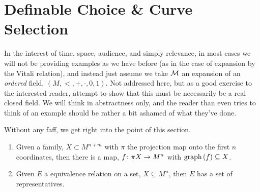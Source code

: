 \section{Definable Choice \& Curve Selection}
\noindent In the interest of time, space, audience, and simply relevance, in most cases we will not be providing examples as we have before (as in the case of expansion by the Vitali relation), and instead just assume we take $\mathcal{M}$ an \om expansion of an \emph{ordered} field, $(M, <, +, \cdot, 0, 1)$. Not addressed here, but as a good exercise to the interested reader, attempt to show that this must be necessarily be a real closed field. We will think in abstractness only, and the reader than even tries to think of an example should be rather a bit ashamed of what they've done.

Without any faff, we get right into the point of this section.

\begin{proposition}
  \begin{enumerate}
    \item Given a  family, $X \subset M^{n+m}$ with $\pi$ the projection map onto the first $n$ coordinates, then there is a  map, $f \colon \pi X \to M^n$ with $\operatorname{graph}\left(f\right) \subseteq X$.
    \item Given $E$ a  equivalence relation on a  set, $X \subseteq M^n$, then $E$ has a set of representatives.
  \end{enumerate}

\end{proposition}
